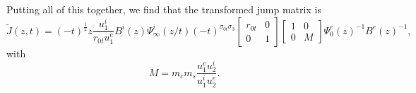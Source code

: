 \documentclass[a4paper,reqno,11pt]{amsart}
\numberwithin{equation}{section}
\numberwithin{figure}{section}
\theoremstyle{plain}
\theoremstyle{remark}
\numberwithin{rhp}{section}
\begin{document}
Putting all of this together, we find that the transformed jump matrix is
\begin{equation}\label{eq:jumptransform}
    \widetilde{J}(z,t)=(-t)^{\frac{1}{2}}z \frac{u_1^i} {r_{0t}u_1^e}{}B^i(z)\Psi_\infty^i(z/t) (-t)^{\sigma_{0t}\sigma_3}\begin{bmatrix}r_{0t} & 0\\
    0 & 1\end{bmatrix}\begin{bmatrix}
        1 & 0\\
        0 & M
    \end{bmatrix}\Psi_0^e(z)^{-1}B^e(z)^{-1},
\end{equation}
with
\begin{equation*}
    M=m_c m_s\frac{u_1^e u_2^i}{u_1^i u_2^e}.
\end{equation*}
\end{document}
